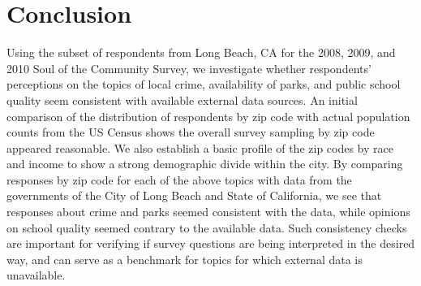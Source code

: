 \section{Conclusion}
Using the subset of respondents from Long Beach, CA for the 2008, 2009, and 2010 Soul of the Community Survey, we investigate whether respondents' perceptions on the topics of local crime, availability of parks, and public school quality seem consistent with available external data sources.  An initial comparison of the distribution of respondents by zip code with actual population counts from the US Census shows the overall survey sampling by zip code appeared reasonable.  We also establish a basic profile of the zip codes by race and income to show a strong demographic divide within the city.  By comparing responses by zip code for each of the above topics with data from the governments of the City of Long Beach and State of California, we see that responses about crime and parks seemed consistent with the data, while opinions on school quality seemed contrary to the available data.  Such consistency checks are important for verifying if survey questions are being interpreted in the desired way, and can serve as a benchmark for topics for which external data is unavailable.

